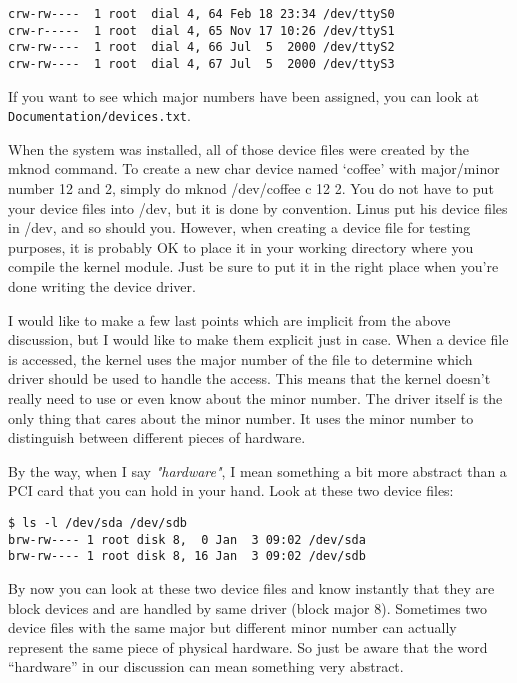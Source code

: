 \documentclass[10pt, oneside]{book}
\begin{document}
\begin{verbatim}
crw-rw----  1 root  dial 4, 64 Feb 18 23:34 /dev/ttyS0
crw-r-----  1 root  dial 4, 65 Nov 17 10:26 /dev/ttyS1
crw-rw----  1 root  dial 4, 66 Jul  5  2000 /dev/ttyS2
crw-rw----  1 root  dial 4, 67 Jul  5  2000 /dev/ttyS3
\end{verbatim}

If you want to see which major numbers have been assigned, you can look at \verb|Documentation/devices.txt|.

When the system was installed, all of those device files were created by the mknod command.
To create a new char device named `coffee' with major/minor number 12 and 2, simply do mknod /dev/coffee c 12 2.
You do not have to put your device files into /dev, but it is done by convention.
Linus put his device files in /dev, and so should you.
However, when creating a device file for testing purposes, it is probably OK to place it in your working directory where you compile the kernel module.
Just be sure to put it in the right place when you're done writing the device driver.

I would like to make a few last points which are implicit from the above discussion, but I would like to make them explicit just in case.
When a device file is accessed, the kernel uses the major number of the file to determine which driver should be used to handle the access.
This means that the kernel doesn't really need to use or even know about the minor number.
The driver itself is the only thing that cares about the minor number.
It uses the minor number to distinguish between different pieces of hardware.

By the way, when I say \emph{"hardware"}, I mean something a bit more abstract than a PCI card that you can hold in your hand.
Look at these two device files:

\begin{verbatim}
$ ls -l /dev/sda /dev/sdb
brw-rw---- 1 root disk 8,  0 Jan  3 09:02 /dev/sda
brw-rw---- 1 root disk 8, 16 Jan  3 09:02 /dev/sdb
\end{verbatim}

By now you can look at these two device files and know instantly that they are block devices and are handled by same driver (block major 8).
Sometimes two device files with the same major but different minor number can actually represent the same piece of physical hardware.
So just be aware that the word ``hardware'' in our discussion can mean something very abstract.
\end{document}
